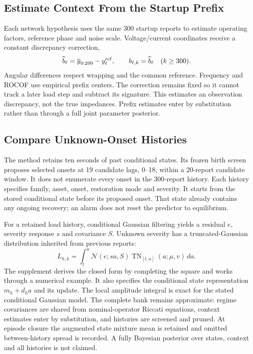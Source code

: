 \subsection{Estimate Context From the Startup Prefix}

Each network hypothesis uses the same 300 startup reports to estimate
operating factors, reference phase and noise scale. Voltage/current
coordinates receive a constant discrepancy correction,
\begin{equation}
 \widehat b_\ell=\overline y_{0:299}-y_\ell^{\rm ref},
 \qquad b_{\ell,k}=\widehat b_\ell\quad(k\ge300).
 \label{eq:continuous-intercept}
\end{equation}
Angular differences respect wrapping and the common reference. Frequency
and ROCOF use empirical prefix centers. The correction remains fixed so it
cannot track a later load step and subtract its signature. This estimates
an observation discrepancy, not the true impedances. Prefix estimates
enter by substitution rather than through a full joint parameter posterior.

\subsection{Compare Unknown-Onset Histories}

The method retains ten seconds of past conditional states. Its frozen birth screen proposes selected onsets at 19 candidate lags,
0--18, within a 20-report candidate window. It does not enumerate every
onset in the 300-report history.
Each history specifies family, asset, onset,
restoration mode and severity. It starts from the stored conditional state
before its proposed onset. That state already contains any ongoing
recovery; an alarm does not reset the predictor to equilibrium.

For a retained load history, conditional Gaussian filtering yields a
residual $e$, severity response $s$ and covariance $S$. Unknown severity
has a truncated-Gaussian distribution inherited from previous reports:
\begin{equation}
 L_{h,k}=\int_l^u \mathcal N(e;sa,S)
             \operatorname{TN}_{[l,u]}(a;\mu,v)\,da.
 \label{eq:narrative-evidence}
\end{equation}
The supplement derives the closed form by completing the square and
works through a numerical example. It also specifies the conditional
state representation $m_h+d_h a$ and its update. The local amplitude
integral is exact for the stated conditional Gaussian model. The complete
bank remains approximate: regime covariances are shared from
nominal-operator Riccati equations, context estimates enter by substitution,
and histories are screened and pruned. At episode closure the augmented
state mixture mean is retained and omitted between-history spread is recorded.
A fully Bayesian posterior over states, context and all histories is not claimed.

